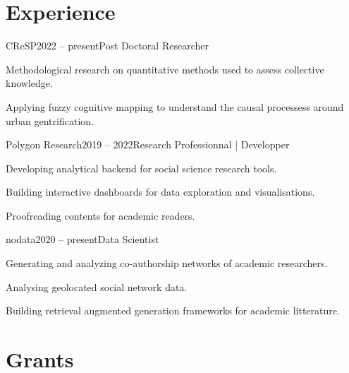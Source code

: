 \documentclass{resume}
\begin{document}
\section{Experience}
\begin{content}

    \begin{position}{CReSP}{2022 -- present}{Post Doctoral Researcher}{}{}
    \item Methodological research on quantitative methods used to assess collective knowledge.
    \item Applying fuzzy cognitive mapping to understand the causal processess around urban gentrification.
    \end{position}
    \vspace{-.1\baselineskip}

    \begin{position}{Polygon Research}{2019 -- 2022}{Research Professionnal | Developper}{}{}
    \item Developing analytical backend for social science research tools.
    \item Building interactive dashboards for data exploration and visualisations.
    \item Proofreading contents for academic readers.
    \end{position}
    
    \begin{position}{nodata}{2020 -- present}{Data Scientist}{}{}
    	\item Generating and analyzing co-authorship networks of academic researchers.
    	\item Analysing geolocated social network data.
    	\item Building retrieval augmented generation frameworks for academic litterature.
    \end{position}

\sectionlineskip
\end{content}
\vspace{-1\medskipamount}

\section{Grants} 
\begin{content}
\end{content}
\end{document}
